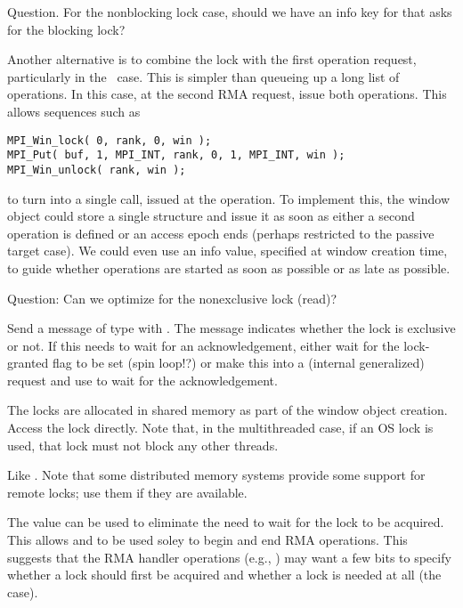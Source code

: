 \documentclass{article}
\begin{document}
Question.  For the nonblocking lock case, should we have an info key
for  that asks for the blocking lock?  

Another alternative is to combine the lock with the first operation
request, particularly in the \tcpname\ case.  This is simpler than
queueing up a long list of operations.  In this case, at the second
RMA request, issue both operations.  This allows sequences such as
\begin{verbatim}
MPI_Win_lock( 0, rank, 0, win );
MPI_Put( buf, 1, MPI_INT, rank, 0, 1, MPI_INT, win );
MPI_Win_unlock( rank, win );
\end{verbatim}
to turn into a single  call, issued at the
 operation.  To implement this, the window
object could store a single  structure and
issue it as soon as either a second operation is defined or an access
epoch ends (perhaps restricted to the passive target case).  We could
even use an info value, specified at window creation time, to guide
whether operations are started as soon as possible or as late as possible.

Question: Can we optimize for the nonexclusive lock (read)?  

\begin{tcp}
Send a message of type  with
.  The message indicates whether the lock is
exclusive or not.  If this needs to wait for an acknowledgement,
either wait for the lock-granted flag to be set (spin loop!?) or make
this into a (internal generalized) request and use
 to wait for the acknowledgement.
\end{tcp}
\begin{shmem}
The locks are allocated in shared memory as part of the window object
creation.  Access the lock directly.  Note that, in the multithreaded
case, if an OS lock is used, that lock must not block any other threads.
\end{shmem}
\begin{via}
Like \tcpname.  Note that some distributed memory systems provide some
support for remote locks; use them if they are available.
\end{via}

The  value  can be used to eliminate
the need to wait for the lock to be acquired.  This allows
 and  to be used soley to begin
and end RMA operations.  This suggests that the RMA handler operations
(e.g., ) may want a few bits to specify
whether a lock should first be acquired and whether a lock is needed
at all (the  case).  
\end{document}
